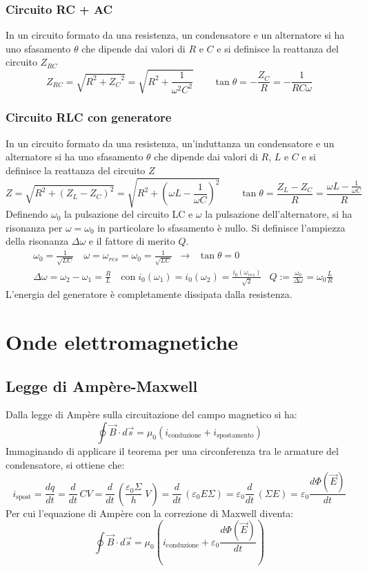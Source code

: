 \documentclass[a4paper]{article}
\newcommand\dt{\frac{d}{dt}\,}
\begin{document}
\subsubsection*{Circuito RC + AC}
In un circuito formato da una resistenza, un condensatore e un alternatore si ha uno sfasamento \(\theta\) che dipende dai valori
di \(R\) e \(C\) e si definisce la reattanza del circuito \(Z_{RC}\)
\[Z_{RC} = \sqrt{R^2 + {Z_C}^2} = \sqrt{R^2 + \frac{1}{\omega^2 C^2}} \qquad \tan \theta = -\frac{Z_C}{R} = -\frac{1}{RC\omega}\]

\subsubsection*{Circuito RLC con generatore}
In un circuito formato da una resistenza, un'induttanza un condensatore e un alternatore si ha uno sfasamento \(\theta\) che
dipende dai valori di \(R\), \(L\) e \(C\) e si definisce la reattanza del circuito \(Z\)
\[Z = \sqrt{R^2 + (Z_L-Z_C)^2} = \sqrt{R^2 + \left( \omega L - \frac{1}{\omega C} \right)^2} \qquad \tan \theta = \frac{Z_L - Z_C}{R} = \frac{\omega L - \frac{1}{\omega C}}{R}\]
Definendo \(\omega_0\) la pulsazione del circuito LC e \(\omega\) la pulsazione dell'alternatore, si ha risonanza per \(\omega = \omega_0\)
in particolare lo sfasamento è nullo. Si definisce l'ampiezza della risonanza \(\Delta \omega\) e il fattore di merito \(Q\).
\begin{align*}
	&\omega_0 = \frac{1}{\sqrt{LC}} \quad \omega = \omega_{res} = \omega_0 = \frac{1}{\sqrt{LC}} \;\; \rightarrow \;\; \tan \theta = 0 \\
	&\Delta \omega = \omega_2 - \omega_1 = \frac{R}{L} \quad \text{con} \; i_0(\omega_1) = i_0(\omega_2) = \frac{i_0(\omega_{res})}{\sqrt{2}}
	&Q := \frac{\omega_0}{\Delta \omega} = \omega_0 \frac{L}{R}
\end{align*}
L'energia del generatore è completamente dissipata dalla resistenza.

\newpage

\section{Onde elettromagnetiche}
\subsection{Legge di Ampère-Maxwell}
Dalla legge di Ampère sulla circuitazione del campo magnetico si ha:
\[\oint \vec{B} \cdot d\vec{s} = \mu_0(i_\text{conduzione} + i_\text{spostamento})\]
Immaginando di applicare il teorema per una circonferenza tra le armature del condensatore, si ottiene che:
\[i_\text{spost} = \frac{dq}{dt} = \dt CV = \dt \left(\frac{\varepsilon_0 \Sigma}{h} \; V\right) = \dt (\varepsilon_0 E \Sigma) = \varepsilon_0 \dt (\Sigma E) = \varepsilon_0 \frac{d \Phi(\vec{E})}{dt}\]
Per cui l'equazione di Ampère con la correzione di Maxwell diventa:
\[\oint \vec{B} \cdot d\vec{s} = \mu_0 \left( i_\text{conduzione} + \varepsilon_0 \frac{d \Phi(\vec{E})}{dt} \right)\]
\end{document}
